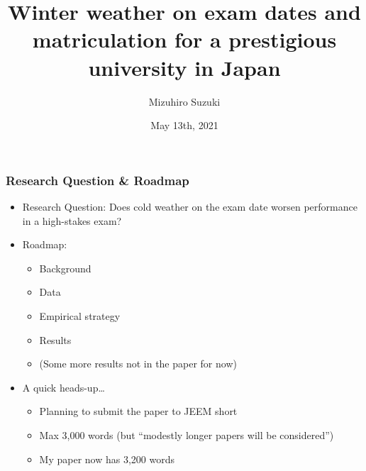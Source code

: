 \documentclass[10pt, pdfmx,hiresbb]{beamer}
\title[Temperature and Exam]{Winter weather on exam dates and matriculation for a prestigious university in Japan}
\author[Suzuki]{Mizuhiro Suzuki}
\date{May 13th, 2021}
\begin{document}
\begin{frame}
\titlepage
\end{frame}

\begin{frame}\frametitle{Research Question \& Roadmap}
  \begin{itemize}
    \item Research Question: Does cold weather on the exam date worsen performance in a high-stakes exam?
    \item Roadmap:
      \begin{itemize}
        \item Background
        \item Data
        \item Empirical strategy
        \item Results
        \item (Some more results not in the paper for now)
      \end{itemize}
    \item A quick heads-up\dots
      \begin{itemize}
        \item Planning to submit the paper to JEEM short 
        \item Max 3,000 words (but ``modestly longer papers will be considered'')
        \item My paper now has 3,200 words
      \end{itemize}
  \end{itemize}
\end{frame}
\end{document}
